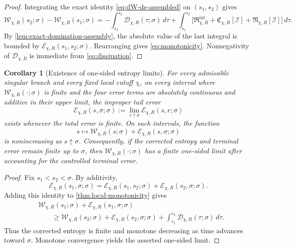 \documentclass[11pt]{amsart}
\numberwithin{equation}{section}
\theoremstyle{plain}
\newtheorem{corollary}[theorem]{Corollary}
\theoremstyle{definition}
\theoremstyle{remark}
\newcommand{\Wloc}{\mathcal W}
\newcommand{\Diss}{\mathcal D}
\newcommand{\Err}{\mathcal E}
\begin{document}
\begin{proof}
Integrating the exact identity \eqref{eq:dW-ds-assembled} on
\((s_1,s_2)\) gives
\[
	\Wloc_{\chi,R}(s_2;\sigma)-\Wloc_{\chi,R}(s_1;\sigma)
	=-\int_{s_1}^{s_2}\Diss_{\chi,R}(\tau;\sigma)\,d\tau
	+\int_{s_1}^{s_2}
	\bigl[
	\mathfrak R_{\chi,R}^{\mathrm{int}}
	+\mathfrak C_{\chi,R}[\mathcal I]
	+\mathfrak N_{\chi,R}[\mathcal I]
	\bigr]\,d\tau .
\]
By \cref{lem:exact-domination-assembly}, the absolute value of the last
integral is bounded by \(\Err_{\chi,R}(s_1,s_2;\sigma)\).  Rearranging
gives \eqref{eq:monotonicity}.  Nonnegativity of
\(\Diss_{\chi,R}\) is immediate from \eqref{eq:dissipation}.
\end{proof}

\begin{corollary}[Existence of one-sided entropy limits]
\label{cor:entropy-limit}
For every admissible singular branch and every fixed local cutoff
\(\chi\), on every interval where \(\Wloc_{\chi,R}(\cdot;\sigma)\) is finite
and the four error terms are absolutely continuous and additive in their
upper limit, the improper tail error
\[
	\Err_{\chi,R}(s,\sigma;\sigma)
	:=\lim_{r\uparrow\sigma}\Err_{\chi,R}(s,r;\sigma)
\]
exists whenever the total error is finite.  On such intervals, the function
\[
	s\longmapsto
	\Wloc_{\chi,R}(s;\sigma)+\Err_{\chi,R}(s,\sigma;\sigma)
\]
is nonincreasing as \(s\uparrow\sigma\).  Consequently, if the corrected
entropy and terminal error remain finite up to \(\sigma\), then
\(\Wloc_{\chi,R}(\cdot;\sigma)\) has a finite one-sided limit after
accounting for the controlled terminal error.
\end{corollary}

\begin{proof}
Fix \(s_1<s_2<\sigma\).  By additivity,
\[
	\Err_{\chi,R}(s_1,\sigma;\sigma)
	=\Err_{\chi,R}(s_1,s_2;\sigma)
	+\Err_{\chi,R}(s_2,\sigma;\sigma).
\]
Adding this identity to \cref{thm:local-monotonicity} gives
\[
\begin{aligned}
	&\Wloc_{\chi,R}(s_1;\sigma)+\Err_{\chi,R}(s_1,\sigma;\sigma)\\
	&\qquad\ge
	\Wloc_{\chi,R}(s_2;\sigma)+\Err_{\chi,R}(s_2,\sigma;\sigma)
	+\int_{s_1}^{s_2}\Diss_{\chi,R}(\tau;\sigma)\,d\tau .
\end{aligned}
\]
Thus the corrected entropy is finite and monotone decreasing as time
advances toward \(\sigma\).  Monotone convergence yields the asserted
one-sided limit.
\end{proof}
\end{document}
